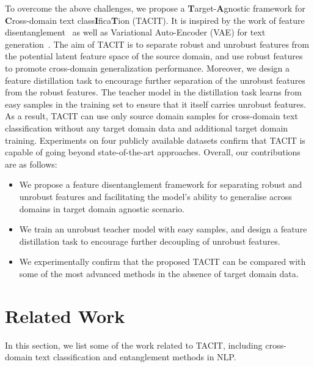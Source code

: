 \documentclass[letterpaper]{article} %
\begin{document}
To overcome the above challenges, we propose a \textbf{T}arget-\textbf{A}gnostic framework for \textbf{C}ross-domain text class\textbf{I}fica\textbf{T}ion (TACIT). It is inspired by the work of feature disentanglement~\cite{HuangZCWY21} as well as Variational Auto-Encoder (VAE) for text generation~\cite{BaoZHLMVDC19}. The aim of TACIT is to separate robust and unrobust features from the potential latent feature space of the source domain, and use robust features to promote cross-domain generalization performance. Moreover, we design a feature distillation task to encourage further separation of the unrobust features from the robust features. The teacher model in the distillation task learns from easy samples in the training set to ensure that it itself carries unrobust features. As a result, TACIT can use only source domain samples for cross-domain text classification without any target domain data and additional target domain training. Experiments on four publicly available datasets confirm that TACIT is capable of going beyond state-of-the-art approaches. Overall, our contributions are as follows:
\begin{itemize}
	\item We propose a feature disentanglement framework for separating robust and unrobust features and facilitating the model's ability to generalise across domains in target domain agnostic scenario.
	\item We train an unrobust teacher model with easy samples, and design a feature distillation task to encourage further decoupling of unrobust features. 
	\item We experimentally confirm that the proposed TACIT can be compared with some of the most advanced methods in the absence of target domain data.
\end{itemize}

\section{Related Work}\label{sec:work}
In this section, we list some of the work related to TACIT, including cross-domain text classification and entanglement methods in NLP.
\end{document}

